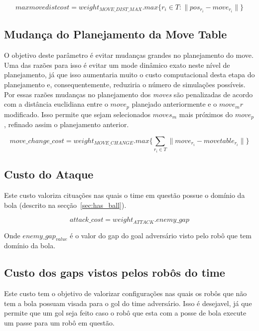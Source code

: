 \begin{dmath} 
 max move dist cost = weight_{MOVE{\_}DIST{\_}MAX} . 
 max \lbrace r_i \in T : \lVert pos_{r_i} - move_{r_i}\rVert \rbrace
\end{dmath} 

\subsection{Mudança do Planejamento da Move Table}\label{subsec:change_cost}
O objetivo deste parâmetro é evitar mudanças grandes no
planejamento do move. Uma das razões para isso é evitar um mode dinâmico
exato neste nível de planejamento, já que isso aumentaria muito o custo
computacional desta etapa do planejamento e, consequentemente, reduziria
o número de simulações possíveis. Por essas razões mudanças no planejamento
dos \textit{moves} são penalizadas de acordo com a distância euclidiana
entre o $move_p$ planejado anteriormente e o $move_mr$ modificado.
Isso permite que sejam selecionados $moves_m$ mais próximos do
$move_p$, refinado assim o planejamento anterior.

\begin{dmath} 
 move{\_}change{\_}cost = weight_{MOVE{\_}CHANGE} . 
 max \lbrace \sum_{r_i \in T} \lVert move_{r_i} - move table_{r_i}\rVert \rbrace
\end{dmath} 

\subsection{Custo do Ataque}
Este custo valoriza cituações nas quais o time em questão
possue o domínio da bola (descrito na secção~\ref{sec:has_ball}).

\begin{dmath} 
 attack{\_}cost = weight_{ATTACK} . enemy{\_}gap
\end{dmath} 

Onde $enemy{\_}gap_{value}$ é o valor do gap do goal adversário visto
pelo robô que tem domínio da bola.

\subsection{Custo dos gaps vistos pelos robôs do time}

Este custo tem o objetivo de valorizar configurações nas quais
os robôs que não tem a bola possuam visada para o gol do time
adversário. Isso
é desejavel, já que permite que um gol seja feito caso o robô
que esta com a posse de bola execute um passe para um robô
em questão.

